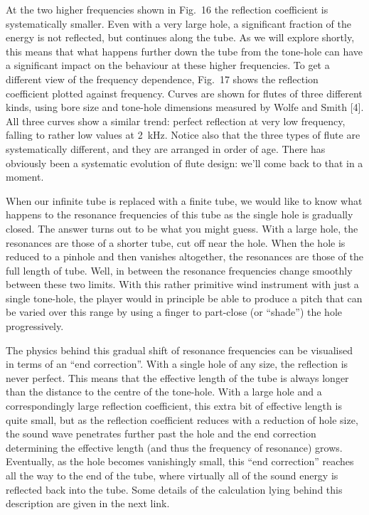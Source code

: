   At the two higher frequencies shown in Fig.\ 16 the reflection coefficient is 
  systematically smaller. Even with a very large hole, a significant fraction 
  of the energy is not reflected, but continues along the tube. As we will 
  explore shortly, this means that what happens further down the tube from the 
  tone-hole can have a significant impact on the behaviour at these higher 
  frequencies. To get a different view of the frequency dependence, Fig.\ 17 
  shows the reflection coefficient plotted against frequency. Curves are shown 
  for flutes of three different kinds, using bore size and tone-hole dimensions 
  measured by Wolfe and Smith [4]. All three curves show a similar trend: 
  perfect reflection at very low frequency, falling to rather low values at 
  2~kHz. Notice also that the three types of flute are systematically 
  different, and they are arranged in order of age. There has obviously been a 
  systematic evolution of flute design: we’ll come back to that in a moment. 

  When our infinite tube is replaced with a finite tube, we would like to know 
  what happens to the resonance frequencies of this tube as the single hole is 
  gradually closed. The answer turns out to be what you might guess. With a 
  large hole, the resonances are those of a shorter tube, cut off near the 
  hole. When the hole is reduced to a pinhole and then vanishes altogether, the 
  resonances are those of the full length of tube. Well, in between the 
  resonance frequencies change smoothly between these two limits. With this 
  rather primitive wind instrument with just a single tone-hole, the player 
  would in principle be able to produce a pitch that can be varied over this 
  range by using a finger to part-close (or “shade”) the hole progressively. 

  The physics behind this gradual shift of resonance frequencies can be 
  visualised in terms of an ``end correction''. With a single hole of any size, 
  the reflection is never perfect. This means that the effective length of the 
  tube is always longer than the distance to the centre of the tone-hole. With 
  a large hole and a correspondingly large reflection coefficient, this extra 
  bit of effective length is quite small, but as the reflection coefficient 
  reduces with a reduction of hole size, the sound wave penetrates further past 
  the hole and the end correction determining the effective length (and thus 
  the frequency of resonance) grows. Eventually, as the hole becomes 
  vanishingly small, this ``end correction'' reaches all the way to the end of 
  the tube, where virtually all of the sound energy is reflected back into the 
  tube. Some details of the calculation lying behind this description are given 
  in the next link. 

